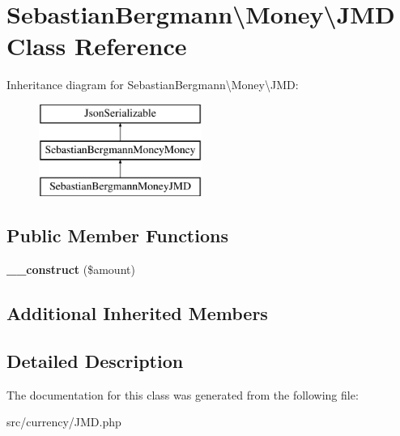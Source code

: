 \hypertarget{classSebastianBergmann_1_1Money_1_1JMD}{}\section{Sebastian\+Bergmann\textbackslash{}Money\textbackslash{}J\+M\+D Class Reference}
\label{classSebastianBergmann_1_1Money_1_1JMD}
Inheritance diagram for Sebastian\+Bergmann\textbackslash{}Money\textbackslash{}J\+M\+D\+:\begin{figure}[H]
\begin{center}
\leavevmode
\includegraphics[height=3.000000cm]{classSebastianBergmann_1_1Money_1_1JMD}
\end{center}
\end{figure}
\subsection*{Public Member Functions}
\begin{DoxyCompactItemize}
\item 
\hypertarget{classSebastianBergmann_1_1Money_1_1JMD_adfdb3ce2a3384c8d521294a595349a2e}{}{\bfseries \+\_\+\+\_\+construct} (\$amount)\label{classSebastianBergmann_1_1Money_1_1JMD_adfdb3ce2a3384c8d521294a595349a2e}

\end{DoxyCompactItemize}
\subsection*{Additional Inherited Members}


\subsection{Detailed Description}


The documentation for this class was generated from the following file\+:\begin{DoxyCompactItemize}
\item 
src/currency/J\+M\+D.\+php\end{DoxyCompactItemize}
